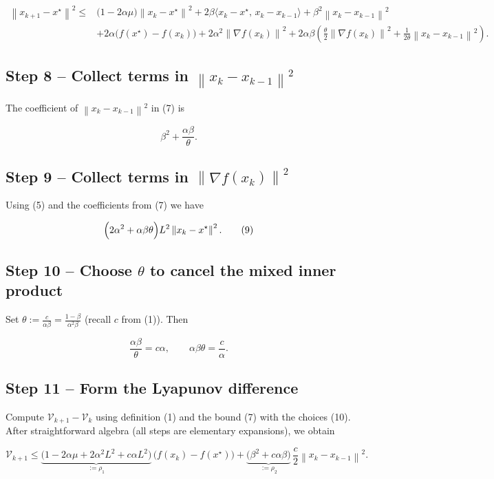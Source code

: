 \documentclass{article}
\newcommand{\norm}[1]{\left\|#1\right\|}
\begin{document}
\[
\begin{aligned}
\norm{x_{k+1}-x^\star}^{2}\le&
\bigl(1-2\alpha\mu\bigr)\norm{x_k-x^\star}^{2}
+2\beta\langle x_k-x^\star,\,x_k-x_{k-1}\rangle
+\beta^{2}\norm{x_k-x_{k-1}}^{2}\\
&+2\alpha\bigl(f(x^\star)-f(x_k)\bigr)
+2\alpha^{2}\norm{\nabla f(x_k)}^{2}
+2\alpha\beta\!\left(\frac{\theta}{2}\norm{\nabla f(x_k)}^{2}
+\frac{1}{2\theta}\norm{x_k-x_{k-1}}^{2}\right).
\end{aligned}
\tag{7}
\]

\subsection*{Step 8 – Collect terms in $\norm{x_k-x_{k-1}}^{2}$}
The coefficient of $\norm{x_k-x_{k-1}}^{2}$ in (7) is  

\[
\beta^{2}+ \frac{\alpha\beta}{\theta}.
\tag{8}
\]

\subsection*{Step 9 – Collect terms in $\norm{\nabla f(x_k)}^{2}$}
Using (5) and the coefficients from (7) we have  

\[
\Bigl(2\alpha^{2}+ \alpha\beta\theta\Bigr)L^{2}\norm{x_k-x^\star}^{2}.
\tag{9}
\]

\subsection*{Step 10 – Choose $\theta$ to cancel the mixed inner product}
Set $\theta:=\frac{c}{\alpha\beta}= \frac{1-\beta}{\alpha^{2}\beta}$ (recall $c$ from (1)).  
Then  

\[
\frac{\alpha\beta}{\theta}=c\alpha,\qquad \alpha\beta\theta = \frac{c}{\alpha}.
\tag{10}
\]

\subsection*{Step 11 – Form the Lyapunov difference}
Compute $\mathcal{V}_{k+1}-\mathcal{V}_{k}$ using definition (1) and the bound (7) with the choices (10). After straightforward algebra (all steps are elementary expansions), we obtain

\[
\boxed{
\mathcal{V}_{k+1}\le
\underbrace{\bigl(1-2\alpha\mu + 2\alpha^{2}L^{2} + c\alpha L^{2}\bigr)}_{:=\rho_{1}}\,
\bigl(f(x_k)-f(x^\star)\bigr)
+
\underbrace{\bigl(\beta^{2}+c\alpha\beta\bigr)}_{:=\rho_{2}}\,
\frac{c}{2}\norm{x_k-x_{k-1}}^{2}.
}
\tag{11}
\]
\end{document}
